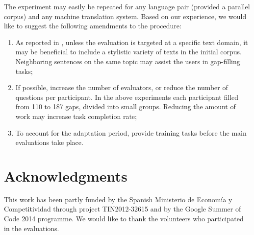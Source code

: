 \documentclass[11pt]{article}
\newcommand{\comment}[1]{\marginpar{\scriptsize\sf \textcolor{blue}{#1}}}
\begin{document}
The experiment may easily be repeated for any language pair (provided a parallel corpus) and
any machine translation system. Based on our experience, we would like to suggest the following amendments to the procedure:
\begin{enumerate}
\item As reported in \cite{oregan13}, unless the evaluation is targeted at a specific text domain, it may be beneficial to include a stylistic variety of texts in the initial corpus. Neighboring sentences on the same topic may assist the users in gap-filling tasks;
\item If possible, increase the number of evaluators, or reduce the number of questions per participant. In the above experiments each participant filled from 110 to 187 gaps, divided into small groups. Reducing the amount of work may increase task completion rate;\comment{MLF's crazy idea: recaptchas?}\comment{EA: the participants did not leave the gaps empty, they just did not attempt the next portions of evaluation after finishing some and getting bored. or did I misunderstand the use of captchas? }
\item To account for the adaptation period, provide training tasks before the main evaluations take place.
\end{enumerate}

\section{Acknowledgments}

This work has been partly funded by the Spanish Ministerio de Econom{\'i}a y Competitividad through project TIN2012-32615 and by the Google Summer of Code 2014 programme. We would like to thank the volunteers who participated in the evaluations.



\comment{EA: urls do not show up in web citations, how can I fix that?}

\end{document}

